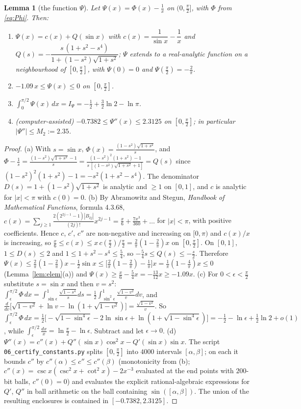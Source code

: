 \documentclass[11pt,a4paper]{article}
\theoremstyle{plain}
\newtheorem{lemma}[theorem]{Lemma}
\theoremstyle{definition}
\numberwithin{equation}{section}
\begin{document}
\begin{lemma}[the function $\Psi$]\label{lem:Psi}
Let $\Psi(x)=\Phi(x)-\frac1x$ on $(0,\frac\pi2]$, with $\Phi$ from \eqref{eq:Phi}. Then:
\begin{enumerate}
\item[(a)] $\Psi(x)=c(x)+Q(\sin x)$ with $c(x)=\dfrac{1}{\sin x}-\dfrac1x$ and $Q(s)=-\dfrac{s\,(1+s^2-s^4)}{1+(1-s^2)\sqrt{1+s^2}}$; $\Psi$ extends to a real-analytic function on a neighbourhood of $[0,\frac\pi2]$, with $\Psi(0)=0$ and $\Psi(\frac\pi2)=-\frac2\pi$.
\item[(b)] $-1.09\,x\le\Psi(x)\le0$ on $[0,\frac\pi2]$.
\item[(c)] $\int_0^{\pi/2}\Psi(x)\,dx=I_\Psi=-\frac12+\frac32\ln2-\ln\pi$.
\item[(d)] (computer-assisted) $-0.7382\le\Psi''(x)\le2.3125$ on $[0,\frac\pi2]$; in particular $|\Psi''|\le M_2:=2.35$.
\end{enumerate}
\end{lemma}
\begin{proof}
(a) With $s=\sin x$, $\Phi(x)=\frac{(1-s^2)\sqrt{1+s^2}}{s}$, and
$\Phi-\frac1s=\frac{(1-s^2)\sqrt{1+s^2}-1}{s}=\frac{(1-s^2)^2(1+s^2)-1}{s\,[(1-s^2)\sqrt{1+s^2}+1]}=Q(s)$ since $(1-s^2)^2(1+s^2)-1=-s^2(1+s^2-s^4)$. The denominator $D(s)=1+(1-s^2)\sqrt{1+s^2}$ is analytic and $\ge1$ on $[0,1]$, and $c$ is analytic for $|x|<\pi$ with $c(0)=0$.
(b) By Abramowitz and Stegun, \emph{Handbook of Mathematical Functions}, formula 4.3.68, $c(x)=\sum_{j\ge1}\frac{2(2^{2j-1}-1)|B_{2j}|}{(2j)!}x^{2j-1}=\frac x6+\frac{7x^3}{360}+\dots$ for $|x|<\pi$, with positive coefficients. Hence $c$, $c'$, $c''$ are non-negative and increasing on $[0,\pi)$ and $c(x)/x$ is increasing, so $\frac x6\le c(x)\le x\,c(\frac\pi2)/\frac\pi2=\frac2\pi(1-\frac2\pi)x$ on $[0,\frac\pi2]$. On $[0,1]$, $1\le D(s)\le2$ and $1\le1+s^2-s^4\le\frac54$, so $-\frac54s\le Q(s)\le-\frac s2$. Therefore $\Psi(x)\le\frac2\pi(1-\frac2\pi)x-\frac12\sin x\le\big[\frac2\pi(1-\frac2\pi)-\frac1\pi\big]x=\frac1\pi(1-\frac4\pi)x\le0$ (Lemma~\ref{lem:elem}(a)) and $\Psi(x)\ge\frac x6-\frac54x=-\frac{13}{12}x\ge-1.09x$.
(c) For $0<\epsilon<\frac\pi2$ substitute $s=\sin x$ and then $v=s^2$:
$\int_\epsilon^{\pi/2}\Phi\,dx=\int_{\sin\epsilon}^1\frac{\sqrt{1-s^4}}{s}ds=\frac12\int_{\sin^2\epsilon}^1\frac{\sqrt{1-v^2}}{v}dv$, and $\frac{d}{dv}\big[\sqrt{1-v^2}+\ln v-\ln(1+\sqrt{1-v^2})\big]=\frac{\sqrt{1-v^2}}{v}$. So $\int_\epsilon^{\pi/2}\Phi\,dx=\frac12\big[-\sqrt{1-\sin^4\epsilon}-2\ln\sin\epsilon+\ln(1+\sqrt{1-\sin^4\epsilon})\big]=-\frac12-\ln\epsilon+\frac12\ln2+o(1)$, while $\int_\epsilon^{\pi/2}\frac{dx}x=\ln\frac\pi2-\ln\epsilon$. Subtract and let $\epsilon\to0$.
(d) $\Psi''(x)=c''(x)+Q''(\sin x)\cos^2x-Q'(\sin x)\sin x$. The script \texttt{06\_certify\_constants.py} splits $[0,\frac\pi2]$ into $4000$ intervals $[\alpha,\beta]$; on each it bounds $c''$ by $c''(\alpha)\le c''\le c''(\beta)$ (monotonicity from (b); $c''(x)=\csc x(\csc^2x+\cot^2x)-2x^{-3}$ evaluated at the end points with $200$-bit balls, $c''(0)=0$) and evaluates the explicit rational-algebraic expressions for $Q'$, $Q''$ in ball arithmetic on the ball containing $\sin([\alpha,\beta])$. The union of the resulting enclosures is contained in $[-0.7382,2.3125]$.
\end{proof}
\end{document}
